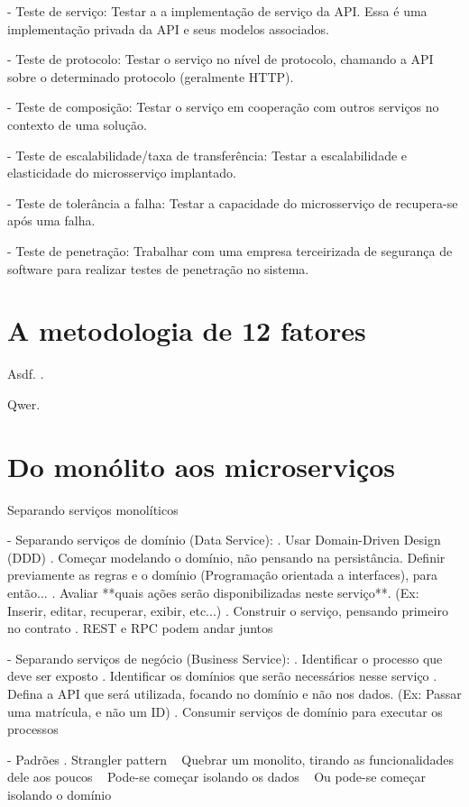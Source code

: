 - Teste de serviço: Testar a a implementação de serviço da API. Essa é uma implementação privada da API e seus modelos associados.

- Teste de protocolo: Testar o serviço no nível de protocolo, chamando a API sobre o determinado protocolo (geralmente HTTP).

- Teste de composição: Testar o serviço em cooperação com outros serviços no contexto de uma solução.

- Teste de escalabilidade/taxa de transferência: Testar a escalabilidade e elasticidade do microsserviço implantado.

- Teste de tolerância a falha: Testar a capacidade do microsserviço de recupera-se após uma falha.

- Teste de penetração: Trabalhar com uma empresa terceirizada de segurança de software para realizar testes de penetração no sistema. \cite{Familiar2015}

\section{A metodologia de 12 fatores}

Asdf. \cite{oracle_microservices}.

Qwer. \cite{12factor}

\section{Do monólito aos microserviços}

Separando serviços monolíticos

- Separando serviços de domínio (Data Service):
    . Usar Domain-Driven Design (DDD)
    . Começar modelando o domínio, não pensando na persistância. Definir previamente as regras e o domínio (Programação orientada a interfaces), para então...
    . Avaliar **quais ações serão disponibilizadas neste serviço**. (Ex: Inserir, editar, recuperar, exibir, etc...)
    . Construir o serviço, pensando primeiro no contrato
    . REST e RPC podem andar juntos

- Separando serviços de negócio (Business Service):
    . Identificar o processo que deve ser exposto
    . Identificar os domínios que serão necessários nesse serviço
    . Defina a API que será utilizada, focando no domínio e não nos dados. (Ex: Passar uma matrícula, e não um ID)
    . Consumir serviços de domínio para executar os processos

- Padrões
    . Strangler pattern
        ~ Quebrar um monolito, tirando as funcionalidades dele aos poucos
        ~ Pode-se começar isolando os dados
        ~ Ou pode-se começar isolando o domínio


